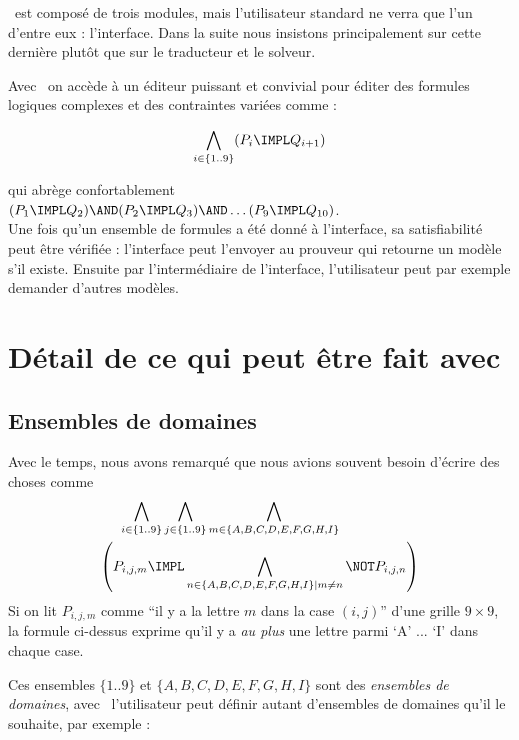 
\nameTool\ est compos\'e de trois modules, mais l'utilisateur standard ne verra que l'un d'entre eux : l'interface. Dans la suite nous insistons principalement sur cette derni\`ere plut\^ot que sur le traducteur et le solveur.

Avec \nameTool\ on acc\`ede \`a un \'editeur puissant et convivial pour \'editer des formules logiques complexes et des contraintes vari\'ees comme :

$$\bigwedge_{i \in \{1..9\}} (P_i \IMPL Q_{i+1})$$

qui abr\`ege confortablement\\ 

$(P_1 \IMPL Q_2) \AND (P_2 \IMPL Q_3) \AND \ldots (P_9\IMPL Q_{10})$. 
\\

Une fois qu'un ensemble de formules a \'et\'e donn\'e \`a l'interface, sa satisfiabilit\'e peut \^etre v\'erifi\'ee : l'interface peut l'envoyer au prouveur qui retourne un mod\`ele s'il existe. Ensuite par l'interm\'ediaire de l'interface, l'utilisateur peut par exemple demander d'autres mod\`eles.


\section{D\'etail de ce qui peut \^etre fait avec \nameTool\label{sec:sat_tobedone}}

\subsection{Ensembles de domaines}
Avec le temps, nous avons remarqu\'e que nous avions souvent besoin d'\'ecrire des choses comme
$$\begin{aligned}\bigwedge_{i \in \{1..9\}} \bigwedge_{j \in \{1..9\}}\bigwedge_{ m\in \{A,B,C,D,E,F,G,H,I\}} \hspace{2cm}\\ \left( P_{i,j,m}\IMPL \bigwedge_{n \in \{A,B,C,D,E,F,G,H,I\}|m\neq n}\NOT P_{i,j,n}\right)\end{aligned}$$
Si on lit $P_{i,j,m}$ comme  ``il y a la lettre $m$ dans la case $(i,j)$'' d'une grille $9\times 9$, la formule ci-dessus exprime qu'il y a \emph{au plus} une lettre parmi `A' ... `I' dans chaque case. 

Ces ensembles $\{1..9\}$ et $\{A,B,C,D,E,F,G,H,I\}$ sont des \emph{ensembles de domaines}, avec \nameTool\ l'utilisateur peut d\'efinir autant d'ensembles de domaines qu'il le souhaite, par exemple :

